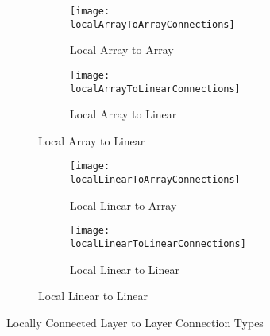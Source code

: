 \begin{figure}[h]
  \centering

  \begin{subfigure}{1.0\textwidth}
    \centering
    \begin{subfigure}{.5\textwidth}
      \centering
      \texttt{[image: localArrayToArrayConnections]}
      \captionsetup{width=.8\textwidth, justification=centering, skip=10pt}
      \caption{Local Array to Array}
      \label{fig:Local Array to Array}
    \end{subfigure}%
    \begin{subfigure}{.5\textwidth}
      \centering
      \texttt{[image: localArrayToLinearConnections]}
      \captionsetup{width=.8\textwidth, justification=centering, skip=10pt}
      \caption{Local Array to Linear}
      \label{fig:Local Array to Linear}
    \end{subfigure}
  \end{subfigure}

  \bigskip

  \begin{subfigure}{1.0\textwidth}
    \centering
    \begin{subfigure}{.5\textwidth}
      \centering
      \texttt{[image: localLinearToArrayConnections]}
      \captionsetup{width=.8\textwidth, justification=centering, skip=10pt}
      \caption{Local Linear to Array}
      \label{fig:Local Linear to Array}
    \end{subfigure}%
    \begin{subfigure}{.5\textwidth}
      \centering
      \texttt{[image: localLinearToLinearConnections]}
      \captionsetup{width=.8\textwidth, justification=centering, skip=10pt}
      \caption{Local Linear to Linear}
      \label{fig:Local Linear to Linear}
    \end{subfigure}
  \end{subfigure}

\captionsetup{justification=centering, skip=10pt}
\caption{Locally Connected Layer to Layer Connection Types}
\label{fig:Locally Connected Layer to Layer Connection Types}
\end{figure}

